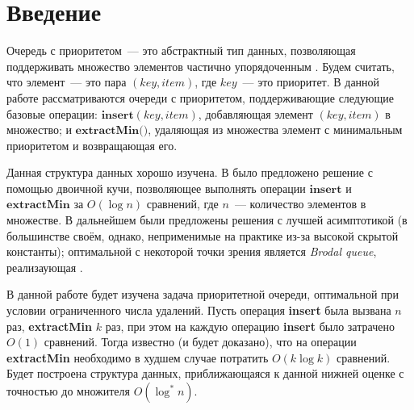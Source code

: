 \chapter*{Введение}							%


Очередь с приоритетом~--- это абстрактный тип данных, позволяющая поддерживать
множество элементов частично упорядоченным \cite{Cormen}. Будем считать, что элемент~---
это пара $(\textit{key}, \textit{item})$, где $key$~--- это приоритет.
В данной работе рассматриваются очереди с приоритетом, поддерживающие следующие
базовые операции: $\textbf{insert}(key, item)$, добавляющая элемент $(key, item)$
в множество; и $\textbf{extractMin()}$, удаляющая
из множества элемент с минимальным приоритетом и возвращающая его.

Данная структура данных хорошо изучена. В  было предложено решение с помощью двоичной кучи, позволяющее выполнять
операции $\textbf{insert}$ и $\textbf{extractMin}$ за $O(\log n)$ сравнений, где $n$~---
количество элементов в множестве. В дальнейшем были предложены решения с лучшей
асимптотикой (в большинстве своём, однако, неприменимые на практике из-за высокой
скрытой константы); оптимальной с некоторой точки зрения является 
\emph{Brodal queue}, реализаующая .

В данной работе будет изучена задача приоритетной очереди, оптимальной
при условии ограниченного числа удалений. Пусть операция \textbf{insert}
была вызвана $n$ раз, \textbf{extractMin} $k$ раз, при этом на каждую
операцию \textbf{insert} было затрачено $O(1)$ сравнений. Тогда известно
(и будет доказано), что на операции \textbf{extractMin} необходимо в худшем
случае потратить $O(k \log k)$ сравнений. Будет построена структура
данных, приближающаяся к данной нижней оценке с точностью до
множителя $O(\log^* n)$.



%
